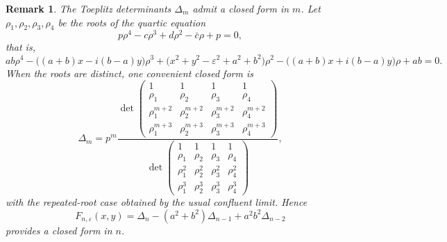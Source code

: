 \documentclass[11pt]{article}
\newtheorem{remark}[theorem]{Remark}
\begin{document}
\begin{remark}\label{rem:quartic-closed-form}
The Toeplitz determinants $\Delta_m$ admit a closed form in $m$. Let
$\rho_1,\rho_2,\rho_3,\rho_4$ be the roots of the quartic equation
\[
p\rho^4-c\rho^3+d\rho^2-\bar c\rho+p=0,
\]
that is,
\[
ab\rho^4-\bigl((a+b)x-i(b-a)y\bigr)\rho^3
+\bigl(x^2+y^2-\varepsilon^2+a^2+b^2\bigr)\rho^2
-\bigl((a+b)x+i(b-a)y\bigr)\rho
+ab=0.
\]
When the roots are distinct, one convenient closed form is
\[
\Delta_m
=p^m
\frac{
\det
\begin{pmatrix}
1&1&1&1\\
\rho_1&\rho_2&\rho_3&\rho_4\\
\rho_1^{m+2}&\rho_2^{m+2}&\rho_3^{m+2}&\rho_4^{m+2}\\
\rho_1^{m+3}&\rho_2^{m+3}&\rho_3^{m+3}&\rho_4^{m+3}
\end{pmatrix}
}{
\det
\begin{pmatrix}
1&1&1&1\\
\rho_1&\rho_2&\rho_3&\rho_4\\
\rho_1^2&\rho_2^2&\rho_3^2&\rho_4^2\\
\rho_1^3&\rho_2^3&\rho_3^3&\rho_4^3
\end{pmatrix}
},
\]
with the repeated-root case obtained by the usual confluent limit. Hence
\[
F_{n,\varepsilon}(x,y)
=\Delta_n-(a^2+b^2)\Delta_{n-1}+a^2b^2\Delta_{n-2}
\]
provides a closed form in $n$.
\end{remark}
\end{document}
